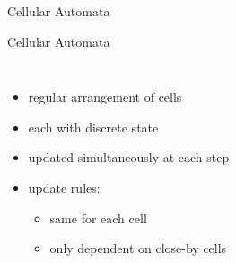 \documentclass[aspectratio=43,t]{beamer}
\begin{document}
\begin{section}{Cellular Automata}
	\begin{frame}{Cellular Automata}
		\begin{columns}
				\centering
				\begin{itemize}
					\item regular arrangement of cells
					\item<2-> each with discrete state
					\item<3-> updated simultaneously at each step 
					\item<4-> update rules:
					\begin{itemize}
						\item<5-> same for each cell
						\item<6-> only dependent on close-by cells
					\end{itemize}
				\end{itemize}
		

\end{columns}
\end{frame}
\end{section}
\end{document}
